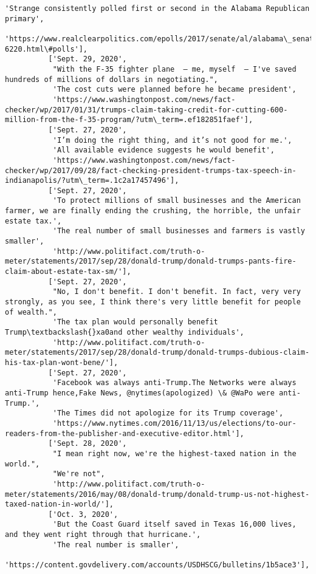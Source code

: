 \documentclass[11pt]{article}
\begin{document}
\begin{Verbatim}[commandchars=\\\{\}]
           'Strange consistently polled first or second in the Alabama Republican primary',
           'https://www.realclearpolitics.com/epolls/2017/senate/al/alabama\_senate\_special\_election\_republican\_primary-6220.html\#polls'],
          ['Sept. 29, 2020',
           "With the F-35 fighter plane  – me, myself  – I've saved hundreds of millions of dollars in negotiating.",
           'The cost cuts were planned before he became president',
           'https://www.washingtonpost.com/news/fact-checker/wp/2017/01/31/trumps-claim-taking-credit-for-cutting-600-million-from-the-f-35-program/?utm\_term=.ef182851faef'],
          ['Sept. 27, 2020',
           'I’m doing the right thing, and it’s not good for me.',
           'All available evidence suggests he would benefit',
           'https://www.washingtonpost.com/news/fact-checker/wp/2017/09/28/fact-checking-president-trumps-tax-speech-in-indianapolis/?utm\_term=.1c2a17457496'],
          ['Sept. 27, 2020',
           'To protect millions of small businesses and the American farmer, we are finally ending the crushing, the horrible, the unfair estate tax.',
           'The real number of small businesses and farmers is vastly smaller',
           'http://www.politifact.com/truth-o-meter/statements/2017/sep/28/donald-trump/donald-trumps-pants-fire-claim-about-estate-tax-sm/'],
          ['Sept. 27, 2020',
           "No, I don't benefit. I don't benefit. In fact, very very strongly, as you see, I think there's very little benefit for people of wealth.",
           'The tax plan would personally benefit Trump\textbackslash{}xa0and other wealthy individuals',
           'http://www.politifact.com/truth-o-meter/statements/2017/sep/28/donald-trump/donald-trumps-dubious-claim-his-tax-plan-wont-bene/'],
          ['Sept. 27, 2020',
           'Facebook was always anti-Trump.The Networks were always anti-Trump hence,Fake News, @nytimes(apologized) \& @WaPo were anti-Trump.',
           'The Times did not apologize for its Trump coverage',
           'https://www.nytimes.com/2016/11/13/us/elections/to-our-readers-from-the-publisher-and-executive-editor.html'],
          ['Sept. 28, 2020',
           "I mean right now, we're the highest-taxed nation in the world.",
           "We're not",
           'http://www.politifact.com/truth-o-meter/statements/2016/may/08/donald-trump/donald-trump-us-not-highest-taxed-nation-in-world/'],
          ['Oct. 3, 2020',
           'But the Coast Guard itself saved in Texas 16,000 lives, and they went right through that hurricane.',
           'The real number is smaller',
           'https://content.govdelivery.com/accounts/USDHSCG/bulletins/1b5ace3'],

\end{Verbatim}
\end{document}
